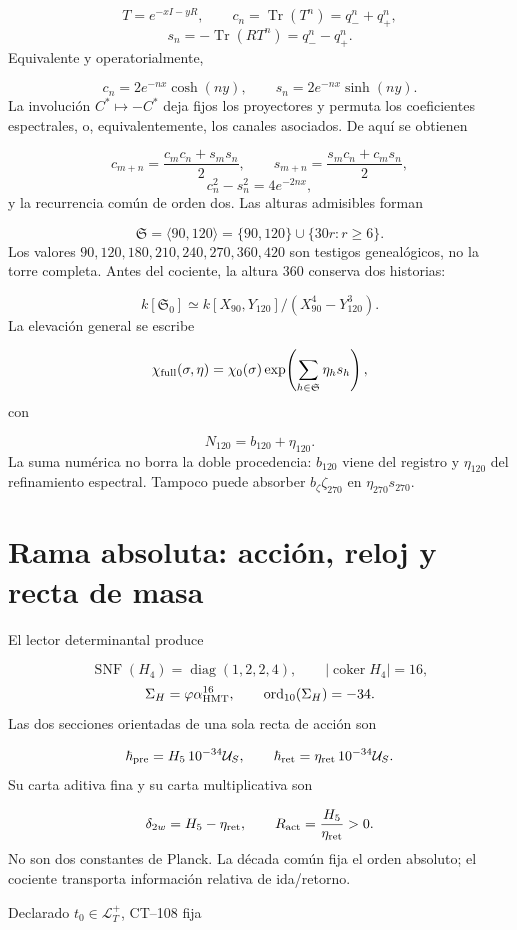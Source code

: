 \[
 T=e^{-xI-yR},\qquad
 c_n=\operatorname{Tr}(T^n)=q_-^n+q_+^n,
\]
\[
 s_n=-\operatorname{Tr}(RT^n)=q_-^n-q_+^n.
\]
Equivalente y operatorialmente,

\[
 c_n=2e^{-nx}\cosh(ny),\qquad
 s_n=2e^{-nx}\sinh(ny).
\]
La involución \(C^*\mapsto-C^*\) deja fijos los proyectores y permuta los coeficientes espectrales, o, equivalentemente, los canales asociados. De aquí se obtienen

\[
 c_{m+n}=\frac{c_mc_n+s_ms_n}{2},\qquad
 s_{m+n}=\frac{s_mc_n+c_ms_n}{2},
\]
\[
 c_n^2-s_n^2=4e^{-2nx},
\]
y la recurrencia común de orden dos. Las alturas admisibles forman

\[
 \mathfrak S=\langle90,120\rangle
 =\{90,120\}\cup\{30r:r\ge6\}.
\]
Los valores \(90,120,180,210,240,270,360,420\) son testigos genealógicos, no la torre completa. Antes del cociente, la altura 360 conserva dos historias:

\[
 k[\mathfrak S_0]
 \simeq k[X_{90},Y_{120}]/(X_{90}^4-Y_{120}^3).
\]
La elevación general se escribe

\[
 \chi_{\rm full}(\sigma,\eta)
 =\chi_0(\sigma)
  \exp\!\left(\sum_{h\in\mathfrak S}\eta_hs_h\right),
\]
con

\[
 N_{120}=b_{120}+\eta_{120}.
\]
La suma numérica no borra la doble procedencia: \(b_{120}\) viene del registro y \(\eta_{120}\) del refinamiento espectral. Tampoco puede absorber \(b_\zeta\zeta_{270}\) en \(\eta_{270}s_{270}\).

\section{Rama absoluta: acción, reloj y recta de masa}
El lector determinantal produce

\[
 \operatorname{SNF}(H_4)=\operatorname{diag}(1,2,2,4),\qquad
 |\operatorname{coker}H_4|=16,
\]
\[
 \Sigma_H=\varphi\alpha_{\rm HMT}^{16},\qquad
 \operatorname{ord}_{10}(\Sigma_H)=-34.
\]
Las dos secciones orientadas de una sola recta de acción son

\[
 \hbar_{\rm pre}=H_5\,10^{-34}\mathcal U_S,
 \qquad
 \hbar_{\rm ret}=\eta_{\rm ret}\,10^{-34}\mathcal U_S.
\]
Su carta aditiva fina y su carta multiplicativa son

\[
 \delta_{2w}=H_5-\eta_{\rm ret},\qquad
 R_{\rm act}=\frac{H_5}{\eta_{\rm ret}}>0.
\]
No son dos constantes de Planck. La década común fija el orden absoluto; el cociente transporta información relativa de ida/retorno.

Declarado \(t_0\in\mathcal L_T^+\), CT--108 fija

